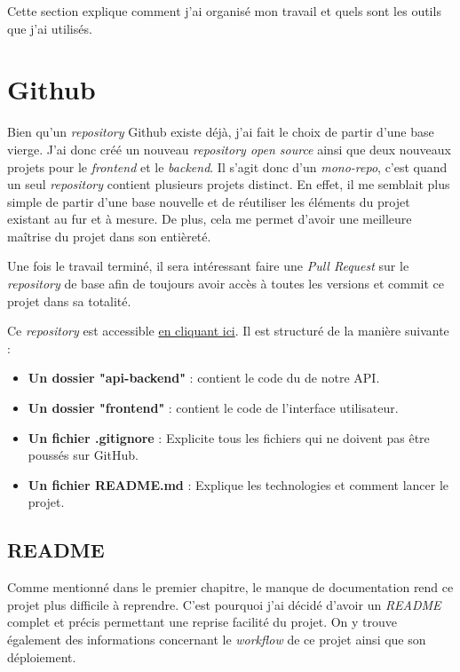 Cette section explique comment j'ai organisé mon travail et quels sont les outils que j'ai utilisés.

\section{Github}
Bien qu'un \emph{repository} Github existe déjà, j'ai fait le choix de partir d'une base vierge. J'ai donc créé un nouveau \emph{repository open source} ainsi que deux nouveaux projets pour le \emph{frontend} et le \emph{backend}. Il s'agit donc d'un \emph{mono-repo}, c'est quand un seul \emph{repository} contient plusieurs projets distinct. En effet, il me semblait plus simple de partir d'une base nouvelle et de réutiliser les éléments du projet existant au fur et à mesure. De plus, cela me permet d'avoir une meilleure maîtrise du projet dans son entièreté.

Une fois le travail terminé, il sera intéressant faire une \emph{Pull Request} sur le \emph{repository} de base afin de toujours avoir accès à toutes les versions et commit ce projet dans sa totalité.

Ce \emph{repository} est accessible \href{https://github.com/Marinlestylo/h-quiz}{en cliquant ici}. Il est structuré de la manière suivante :
\begin{itemize}
    \item \textbf{Un dossier "api-backend"} : contient le code du de notre API.
    \item \textbf{Un dossier "frontend"} : contient le code de l'interface utilisateur.
    \item \textbf{Un fichier .gitignore} : Explicite tous les fichiers qui ne doivent pas être poussés sur GitHub.
    \item \textbf{Un fichier README.md} : Explique les technologies et comment lancer le projet.
\end{itemize}

\subsection{README}
Comme mentionné dans le premier chapitre, le manque de documentation rend ce projet plus difficile à reprendre. C'est pourquoi j'ai décidé d'avoir un \emph{README} complet et précis permettant une reprise facilité du projet. On y trouve également des informations concernant le \emph{workflow} de ce projet ainsi que son déploiement.

